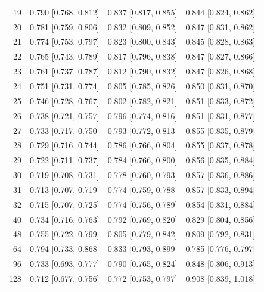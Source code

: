 \begin{longtable}{rccc}
19 & 0.790 [0.768, 0.812] & 0.837 [0.817, 0.855] & 0.844 [0.824, 0.862] \\
20 & 0.781 [0.759, 0.806] & 0.832 [0.809, 0.852] & 0.847 [0.831, 0.862] \\
21 & 0.774 [0.753, 0.797] & 0.823 [0.800, 0.843] & 0.845 [0.828, 0.863] \\
22 & 0.765 [0.743, 0.789] & 0.817 [0.796, 0.838] & 0.847 [0.827, 0.866] \\
23 & 0.761 [0.737, 0.787] & 0.812 [0.790, 0.832] & 0.847 [0.826, 0.868] \\
24 & 0.751 [0.731, 0.774] & 0.805 [0.785, 0.826] & 0.850 [0.831, 0.870] \\
25 & 0.746 [0.728, 0.767] & 0.802 [0.782, 0.821] & 0.851 [0.833, 0.872] \\
26 & 0.738 [0.721, 0.757] & 0.796 [0.774, 0.816] & 0.851 [0.831, 0.877] \\
27 & 0.733 [0.717, 0.750] & 0.793 [0.772, 0.813] & 0.855 [0.835, 0.879] \\
28 & 0.729 [0.716, 0.744] & 0.786 [0.766, 0.804] & 0.855 [0.837, 0.878] \\
29 & 0.722 [0.711, 0.737] & 0.784 [0.766, 0.800] & 0.856 [0.835, 0.884] \\
30 & 0.719 [0.708, 0.731] & 0.778 [0.760, 0.793] & 0.857 [0.836, 0.886] \\
31 & 0.713 [0.707, 0.719] & 0.774 [0.759, 0.788] & 0.857 [0.833, 0.894] \\
32 & 0.715 [0.707, 0.725] & 0.774 [0.756, 0.789] & 0.854 [0.831, 0.884] \\
40 & 0.734 [0.716, 0.763] & 0.792 [0.769, 0.820] & 0.829 [0.804, 0.856] \\
48 & 0.755 [0.722, 0.799] & 0.805 [0.779, 0.842] & 0.809 [0.792, 0.831] \\
64 & 0.794 [0.733, 0.868] & 0.833 [0.793, 0.899] & 0.785 [0.776, 0.797] \\
96 & 0.733 [0.693, 0.777] & 0.790 [0.765, 0.824] & 0.848 [0.806, 0.913] \\
128 & 0.712 [0.677, 0.756] & 0.772 [0.753, 0.797] & 0.908 [0.839, 1.018] \\
\end{longtable}
